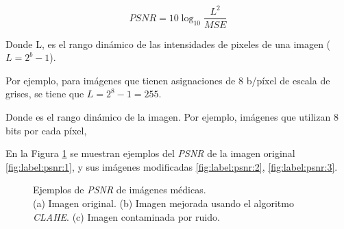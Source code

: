 \begin{equation}\label{eq:psnr}
PSNR = 10\log_{10} \frac{L^2}{MSE}
\end{equation}

Donde L, es el rango dinámico de las intensidades de pixeles de una imagen ($L = 2^b - 1$).

Por ejemplo, para imágenes que tienen asignaciones de 8 b/píxel de escala de grises, se tiene que $L = 2^8 - 1 = 255$.

Donde es el rango dinámico de la imagen. Por ejemplo, imágenes que utilizan 8 bits
por cada píxel, 



En la Figura \ref{fig:psnr} se muestran ejemplos del \textit{PSNR} de la imagen original \ref{fig:label:psnr:1}, y sus imágenes modificadas \ref{fig:label:psnr:2}, \ref{fig:label:psnr:3}.

\begin{figure}[H]
    \begin{center}
    \end{center}
    \caption{Ejemplos de \textit{PSNR} de imágenes médicas. \\
    (a) Imagen original.
    (b) Imagen mejorada usando el algoritmo \textit{CLAHE}.
    (c) Imagen contaminada por ruido.}
    \label{fig:psnr}
\end{figure}


